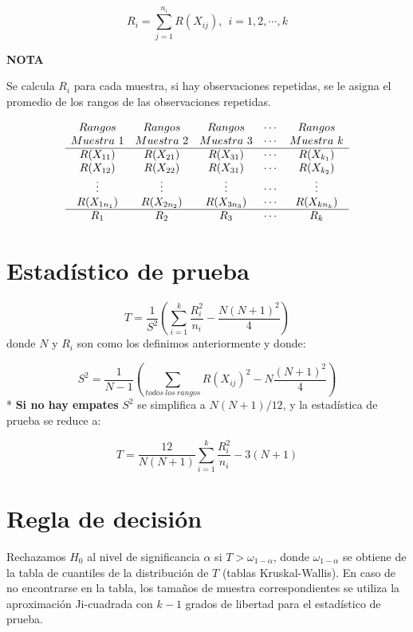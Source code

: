 \documentclass[
  a4paper,
  oneside,
  openany]{book}
\begin{document}
\[R_{i}=\sum_{j=1}^{n_{i}} R(X_{ij}), \ \ i= 1, 2,\cdots,k\]

\textbf{NOTA}

Se calcula \(R_{i}\) para cada muestra, si hay observaciones repetidas, se le asigna el promedio de los rangos de las observaciones repetidas.

\[
\begin{array}{c c c c c} 
Rangos & Rangos & Rangos & \cdots  & Rangos \\
Muestra\ 1 & Muestra \ 2 & Muestra\ 3 & \cdots & Muestra\ k \\
\hline
R(X_{11}) &  R(X_{21}) & R(X_{31})  & \cdots & R(X_{k_{1}}) \\ 
R(X_{12}) &  R(X_{22}) & R(X_{31}) & \cdots & R(X_{k_{2}}) \\  
\vdots &  \vdots & \vdots  & \cdots &\vdots \\ 
R(X_{1n_{1}}) &R(X_{2n_{2}})   &R(X_{3n_{3}})   & \cdots &  R(X_{kn_{k}}) \\ 
\hline
R_{1} & R_{2} & R_{3} & \cdots&R_{k} \\
\end{array}
\]

\hypertarget{estaduxedstico-de-prueba-6}{%
\section{Estadístico de prueba}\label{estaduxedstico-de-prueba-6}}

\[T= \frac{1}{S^2}\left(\sum_{i=1}^{k}\frac{R^2_{i}}{n_{i}}-\frac{N(N+1)^2}{4}\right)\]
donde \(N\) y \(R_{i}\) son como los definimos anteriormente y donde:

\[ S^2 = \frac{1}{N-1}\left(\sum_{todos\ los\ rangos}R(X_{ij})^2-N\frac{(N+1)^2}{4}\right)\]
* \textbf{Si no hay empates} \(S^2\) se simplifica a \(N(N+1)/12\), y la estadística de prueba se reduce a:

\[ T= \frac{12}{N(N+1)}\sum_{i=1}^{k}\frac{R^2_{i}}{n_{i}}-3(N+1) \]

\hypertarget{regla-de-decisiuxf3n-16}{%
\section{Regla de decisión}\label{regla-de-decisiuxf3n-16}}

Rechazamos \(H_0\) al nivel de significancia \(\alpha\) si \(T>\omega_{1-\alpha}\), donde \(\omega_{1-\alpha}\) se obtiene de la tabla de cuantiles de la distribución de \(T\) (tablas Kruskal-Wallis). En caso de no encontrarse en la tabla, los tamaños de muestra correspondientes se utiliza la aproximación Ji-cuadrada con \(k-1\) grados de libertad para el estadístico de prueba.
\end{document}
